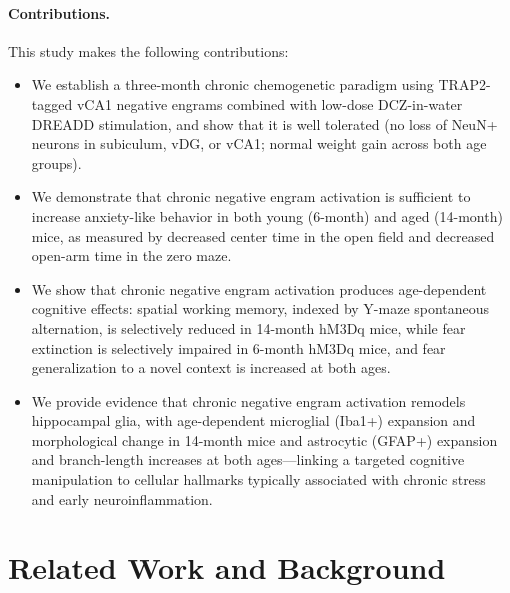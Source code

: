\paragraph{Contributions.} This study makes the following contributions:
\begin{itemize}
  \item We establish a three-month chronic chemogenetic paradigm using TRAP2-tagged vCA1 negative engrams combined with low-dose DCZ-in-water DREADD stimulation, and show that it is well tolerated (no loss of NeuN+ neurons in subiculum, vDG, or vCA1; normal weight gain across both age groups).
  \item We demonstrate that chronic negative engram activation is sufficient to increase anxiety-like behavior in both young (6-month) and aged (14-month) mice, as measured by decreased center time in the open field and decreased open-arm time in the zero maze.
  \item We show that chronic negative engram activation produces age-dependent cognitive effects: spatial working memory, indexed by Y-maze spontaneous alternation, is selectively reduced in 14-month hM3Dq mice, while fear extinction is selectively impaired in 6-month hM3Dq mice, and fear generalization to a novel context is increased at both ages.
  \item We provide evidence that chronic negative engram activation remodels hippocampal glia, with age-dependent microglial (Iba1+) expansion and morphological change in 14-month mice and astrocytic (GFAP+) expansion and branch-length increases at both ages---linking a targeted cognitive manipulation to cellular hallmarks typically associated with chronic stress and early neuroinflammation.
\end{itemize}

\section{Related Work and Background}

